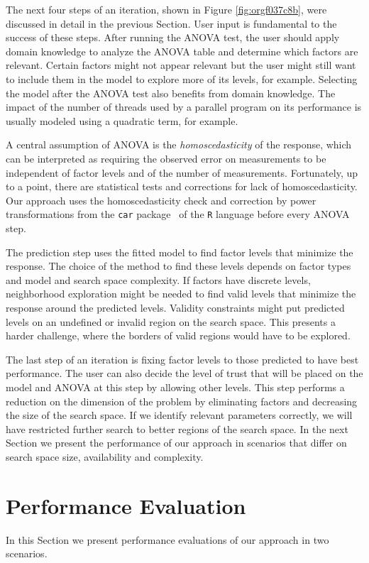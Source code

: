 \documentclass[conference]{IEEEtran}
\begin{document}
The next four steps of an iteration, shown in Figure \ref{fig:orgf037c8b},
were discussed in detail in the previous Section. User input is fundamental to
the success of these steps. After running the ANOVA test, the user should apply
domain knowledge to analyze the ANOVA table and determine which factors are
relevant. Certain factors might not appear relevant but the user might still
want to include them in the model to explore more of its levels, for example.
Selecting the model after the ANOVA test also benefits from domain knowledge.
The impact of the number of threads used by a parallel program on its
performance is usually modeled using a quadratic term, for example.

A central assumption of ANOVA is the \emph{homoscedasticity} of the response, which
can be interpreted as requiring the observed error on measurements to be
independent of factor levels and of the number of measurements. Fortunately, up
to a point, there are statistical tests and corrections for lack of
homoscedasticity. Our approach uses the homoscedasticity check and correction by
power transformations from the \texttt{car} package~\cite{fox2011car} of the \texttt{R}
language before every ANOVA step.

The prediction step uses the fitted model to find factor levels that minimize
the response. The choice of the method to find these levels depends on factor
types and model and search space complexity. If factors have discrete levels,
neighborhood exploration might be needed to find valid levels that minimize the
response around the predicted levels. Validity constraints might put predicted
levels on an undefined or invalid region on the search space. This presents a
harder challenge, where the borders of valid regions would have to be explored.

The last step of an iteration is fixing factor levels to those predicted to have
best performance. The user can also decide the level of trust that will be
placed on the model and ANOVA at this step by allowing other levels. This step
performs a reduction on the dimension of the problem by eliminating factors and
decreasing the size of the search space. If we identify relevant parameters
correctly, we will have restricted further search to better regions of the
search space. In the next Section we present the performance of our approach in
scenarios that differ on search space size, availability and complexity.
\section{Performance Evaluation}
\label{sec:org820b73e}
In this Section we present performance evaluations of our approach in two
scenarios.
\end{document}

